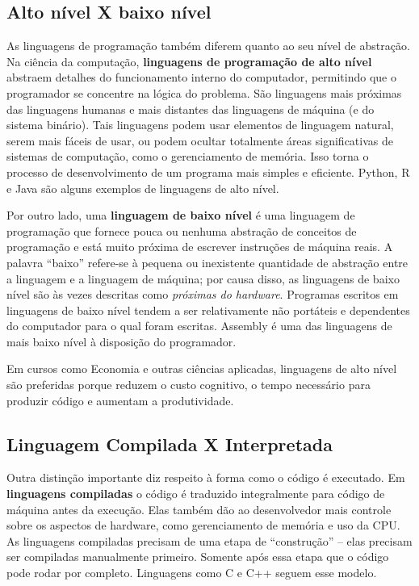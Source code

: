 \documentclass[
  brazilian,
  letterpaper,
  DIV=11,
  numbers=noendperiod]{scrreprt}
\begin{document}
\subsection{Alto nível X baixo
nível}\label{alto-nuxedvel-x-baixo-nuxedvel}

As linguagens de programação também diferem quanto ao seu nível de
abstração. Na ciência da computação, \textbf{linguagens de programação
de alto nível} abstraem detalhes do funcionamento interno do computador,
permitindo que o programador se concentre na lógica do problema. São
linguagens mais próximas das linguagens humanas e mais distantes das
linguagens de máquina (e do sistema binário). Tais linguagens podem usar
elementos de linguagem natural, serem mais fáceis de usar, ou podem
ocultar totalmente áreas significativas de sistemas de computação, como
o gerenciamento de memória. Isso torna o processo de desenvolvimento de
um programa mais simples e eficiente. Python, R e Java são alguns
exemplos de linguagens de alto nível.

Por outro lado, uma \textbf{linguagem de baixo nível} é uma linguagem de
programação que fornece pouca ou nenhuma abstração de conceitos de
programação e está muito próxima de escrever instruções de máquina
reais. A palavra ``baixo'' refere-se à pequena ou inexistente quantidade
de abstração entre a linguagem e a linguagem de máquina; por causa
disso, as linguagens de baixo nível são às vezes descritas como
\emph{próximas do hardware}. Programas escritos em linguagens de baixo
nível tendem a ser relativamente não portáteis e dependentes do
computador para o qual foram escritas. Assembly é uma das linguagens de
mais baixo nível à disposição do programador.

Em cursos como Economia e outras ciências aplicadas, linguagens de alto
nível são preferidas porque reduzem o custo cognitivo, o tempo
necessário para produzir código e aumentam a produtividade.

\subsection{Linguagem Compilada X
Interpretada}\label{linguagem-compilada-x-interpretada}

Outra distinção importante diz respeito à forma como o código é
executado. Em \textbf{linguagens compiladas} o código é traduzido
integralmente para código de máquina antes da execução. Elas também dão
ao desenvolvedor mais controle sobre os aspectos de hardware, como
gerenciamento de memória e uso da CPU. As linguagens compiladas precisam
de uma etapa de ``construção'' -- elas precisam ser compiladas
manualmente primeiro. Somente após essa etapa que o código pode rodar
por completo. Linguagens como C e C++ seguem esse modelo.
\end{document}
